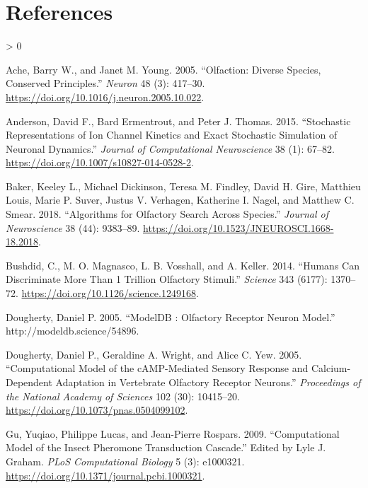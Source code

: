 \documentclass[
]{article}
\newlength{\cslhangindent}
\newenvironment{CSLReferences}[2] %
 {%
  \setlength{\parindent}{0pt}
  \ifodd #1 \everypar{\setlength{\hangindent}{\cslhangindent}}\ignorespaces\fi
  \ifnum #2 > 0
  \setlength{\parskip}{#2\baselineskip}
  \fi
 }%
 {}
\begin{document}
\hypertarget{references}{%
\section*{References}\label{references}}

\hypertarget{refs}{}
\begin{CSLReferences}{1}{0}
\leavevmode\hypertarget{ref-ache05olfaction}{}%
Ache, Barry W., and Janet M. Young. 2005. {``Olfaction: {Diverse Species}, {Conserved Principles}.''} \emph{Neuron} 48 (3): 417--30. \url{https://doi.org/10.1016/j.neuron.2005.10.022}.

\leavevmode\hypertarget{ref-anderson15stochastica}{}%
Anderson, David F., Bard Ermentrout, and Peter J. Thomas. 2015. {``Stochastic Representations of Ion Channel Kinetics and Exact Stochastic Simulation of Neuronal Dynamics.''} \emph{Journal of Computational Neuroscience} 38 (1): 67--82. \url{https://doi.org/10.1007/s10827-014-0528-2}.

\leavevmode\hypertarget{ref-baker18algorithmsa}{}%
Baker, Keeley L., Michael Dickinson, Teresa M. Findley, David H. Gire, Matthieu Louis, Marie P. Suver, Justus V. Verhagen, Katherine I. Nagel, and Matthew C. Smear. 2018. {``Algorithms for {Olfactory Search} Across {Species}.''} \emph{Journal of Neuroscience} 38 (44): 9383--89. \url{https://doi.org/10.1523/JNEUROSCI.1668-18.2018}.

\leavevmode\hypertarget{ref-bushdid14humans}{}%
Bushdid, C., M. O. Magnasco, L. B. Vosshall, and A. Keller. 2014. {``Humans {Can Discriminate More} Than 1 {Trillion Olfactory Stimuli}.''} \emph{Science} 343 (6177): 1370--72. \url{https://doi.org/10.1126/science.1249168}.

\leavevmode\hypertarget{ref-dougherty05modeldb}{}%
Dougherty, Daniel P. 2005. {``{ModelDB} : {Olfactory} Receptor Neuron Model.''} http://modeldb.science/54896.

\leavevmode\hypertarget{ref-dougherty05computational}{}%
Dougherty, Daniel P., Geraldine A. Wright, and Alice C. Yew. 2005. {``Computational Model of the {cAMP}-Mediated Sensory Response and Calcium-Dependent Adaptation in Vertebrate Olfactory Receptor Neurons.''} \emph{Proceedings of the National Academy of Sciences} 102 (30): 10415--20. \url{https://doi.org/10.1073/pnas.0504099102}.

\leavevmode\hypertarget{ref-gu09computational}{}%
Gu, Yuqiao, Philippe Lucas, and Jean-Pierre Rospars. 2009. {``Computational {Model} of the {Insect Pheromone Transduction Cascade}.''} Edited by Lyle J. Graham. \emph{PLoS Computational Biology} 5 (3): e1000321. \url{https://doi.org/10.1371/journal.pcbi.1000321}.


\end{CSLReferences}
\end{document}
